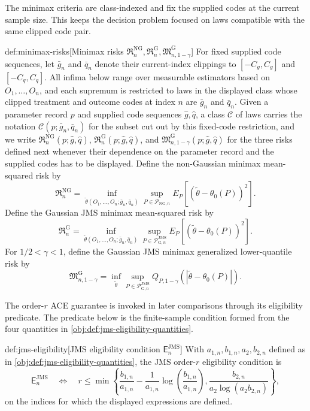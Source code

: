 \documentclass[11pt]{article}
\begin{document}
The minimax criteria are class-indexed and fix the supplied codes at the current sample size. This keeps the decision problem focused on laws compatible with the same clipped code pair.

\begin{definitionv}{def:minimax-risks}[Minimax risks \(\mathfrak R_n^{\mathrm{NG}},\mathfrak R_n^{\mathrm G},\mathfrak M_{n,1-\gamma}^{\mathrm G}\)]
For fixed supplied code sequences, let \(\bar g_n\) and \(\bar q_n\) denote their current-index clippings to \([-C_g,C_g]\) and \([-C_q,C_q]\). All infima below range over measurable estimators based on \(O_1,\ldots,O_n\), and each supremum is restricted to laws in the displayed class whose clipped treatment and outcome codes at index \(n\) are \(\bar g_n\) and \(\bar q_n\). Given a parameter record \(p\) and supplied code sequences \(\widehat g,\widehat q\), a class \(\mathcal C\) of laws carries the notation \(\mathcal C(p;\bar g_n,\bar q_n)\) for the subset cut out by this fixed-code restriction, and we write \(\mathfrak R_n^{\mathrm{NG}}(p;\widehat g,\widehat q)\), \(\mathfrak R_n^{\mathrm G}(p;\widehat g,\widehat q)\), and \(\mathfrak M_{n,1-\gamma}^{\mathrm G}(p;\widehat g,\widehat q)\) for the three risks defined next whenever their dependence on the parameter record and the supplied codes has to be displayed. Define the non-Gaussian minimax mean-squared risk by
\[
\mathfrak R_n^{\mathrm{NG}}
=
\inf_{\widetilde\theta(O_1,\ldots,O_n;\bar g_n,\bar q_n)}
\sup_{P\in\mathcal P_{\mathrm{NG},n}}
E_P\!\left[(\widetilde\theta-\theta_0(P))^2\right].
\]
Define the Gaussian JMS minimax mean-squared risk by
\[
\mathfrak R_n^{\mathrm G}
=
\inf_{\widetilde\theta(O_1,\ldots,O_n;\bar g_n,\bar q_n)}
\sup_{P\in\mathcal P_{\mathrm G,n}^{\mathrm{JMS}}}
E_P\!\left[(\widetilde\theta-\theta_0(P))^2\right].
\]
For \(1/2<\gamma<1\), define the Gaussian JMS minimax generalized lower-quantile risk by
\[
\mathfrak M_{n,1-\gamma}^{\mathrm G}
=
\inf_{\widetilde\theta}
\sup_{P\in\mathcal P_{\mathrm G,n}^{\mathrm{JMS}}}
Q_{P,1-\gamma}\!\left(|\widetilde\theta-\theta_0(P)|\right).
\]
\end{definitionv}

The order-\(r\) ACE guarantee is invoked in later comparisons through its eligibility predicate. The predicate below is the finite-sample condition formed from the four quantities in \cref{obj:def:jms-eligibility-quantities}.

\begin{definitionv}{def:jms-eligibility}[JMS eligibility condition \(\mathsf E_n^{\mathrm{JMS}}\)]
With \(a_{1,n},b_{1,n},a_2,b_{2,n}\) defined as in \cref{obj:def:jms-eligibility-quantities}, the JMS order-\(r\) eligibility condition is
\[
\mathsf E_n^{\mathrm{JMS}}
\quad\Longleftrightarrow\quad
r\le
\min\left\{
\frac{b_{1,n}}{a_{1,n}}
-\frac{1}{a_{1,n}}\log\left(\frac{b_{1,n}}{a_{1,n}}\right),
\frac{b_{2,n}}{a_2\log(a_2b_{2,n})}
\right\},
\]
on the indices for which the displayed expressions are defined.
\end{definitionv}
\end{document}
